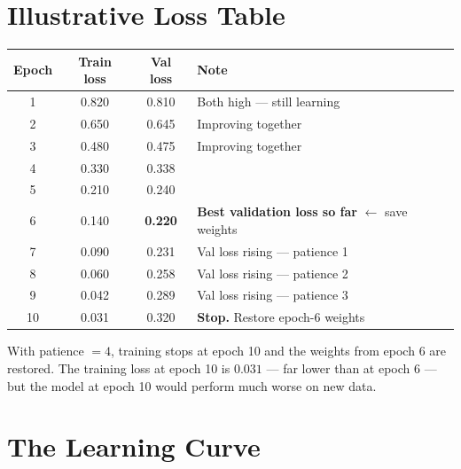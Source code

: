 \documentclass[12pt, a4paper]{article}
\theoremstyle{definition}
\begin{document}
\section{Illustrative Loss Table}

\begin{center}
\renewcommand{\arraystretch}{1.4}
\begin{tabular}{cccp{5cm}}
\toprule
Epoch & Train loss & Val loss & Note \\
\midrule
1  & 0.820 & 0.810 & Both high --- still learning \\
2  & 0.650 & 0.645 & Improving together \\
3  & 0.480 & 0.475 & Improving together \\
4  & 0.330 & 0.338 & \\
5  & 0.210 & 0.240 & \\
\rowcolor{greenbg!60}
6  & 0.140 & \textbf{0.220} & \textbf{Best validation loss so far} $\leftarrow$ save weights \\
7  & 0.090 & 0.231 & Val loss rising --- patience 1 \\
8  & 0.060 & 0.258 & Val loss rising --- patience 2 \\
9  & 0.042 & 0.289 & Val loss rising --- patience 3 \\
\rowcolor{warnbg!60}
10 & 0.031 & 0.320 & \textbf{Stop.} Restore epoch-6 weights \\
\bottomrule
\end{tabular}
\end{center}

With patience $= 4$, training stops at epoch 10 and the weights from
epoch 6 are restored.  The training loss at epoch 10 is $0.031$ ---
far lower than at epoch 6 --- but the model at epoch 10 would perform
much worse on new data.

\section{The Learning Curve}
\end{document}
